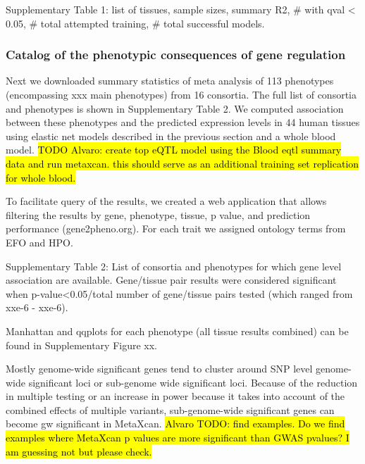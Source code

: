 \documentclass[10pt]{article}
\begin{document}

Supplementary Table 1: list of tissues, sample sizes, summary R2, \# with qval < 0.05, \# total attempted training, \# total successful models.

\subsubsection*{Catalog of the phenotypic consequences of gene regulation}

Next we downloaded summary statistics of meta analysis of 113 phenotypes (encompassing xxx main phenotypes) from 16 consortia. The full list of consortia and phenotypes is shown in Supplementary Table 2. We computed association between these phenotypes and the predicted expression levels in 44 human tissues using elastic net models described in the previous section and a whole blood model. \hl{TODO Alvaro: create top eQTL model using the Blood eqtl summary data and run metaxcan. this should serve as an additional training set replication for whole blood.}

To facilitate query of the results, we created a web application that allows filtering the results by gene, phenotype, tissue, p value, and prediction performance (gene2pheno.org).
For each trait we assigned ontology terms from EFO and HPO. 

Supplementary Table 2: List of consortia and phenotypes for which gene level association are available. Gene/tissue pair results were considered significant when p-value<0.05/total number of gene/tissue pairs tested (which ranged from xxe-6 - xxe-6).

Manhattan and qqplots for each phenotype (all tissue results combined) can be found in Supplementary Figure xx.

Mostly genome-wide significant genes tend to cluster around SNP level genome-wide significant loci or sub-genome wide significant loci. Because of the reduction in multiple testing or an increase in power because it takes into account of the combined effects of multiple variants, sub-genome-wide significant genes can become gw significant in MetaXcan. \hl{Alvaro TODO: find examples. Do we find examples where MetaXcan p values are more significant than GWAS pvalues? I am guessing not but please check.}
\end{document}
